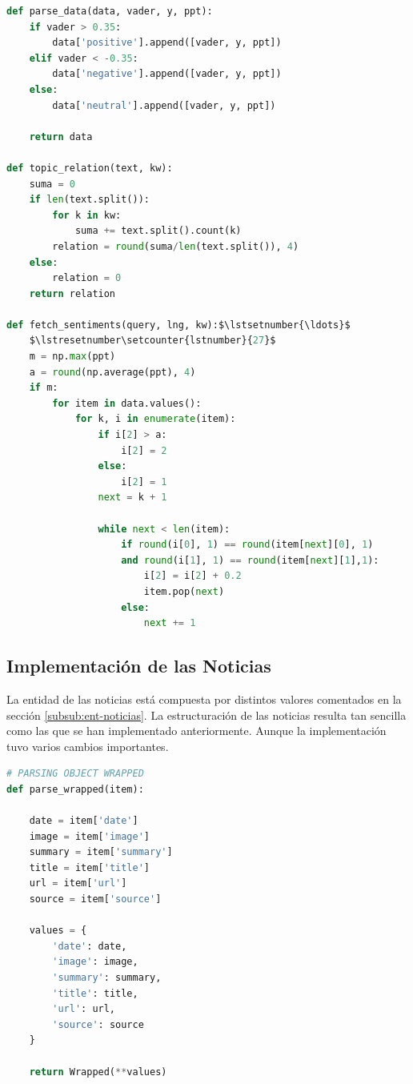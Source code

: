 \vspace{0.3cm}

\begin{lstlisting}[caption=Extracción de las coordenadas de los sentimientos,          label={lst:extraccion-senti},language=Python, mathescape=true]
def parse_data(data, vader, y, ppt):
    if vader > 0.35:
        data['positive'].append([vader, y, ppt])
    elif vader < -0.35:
        data['negative'].append([vader, y, ppt])
    else:
        data['neutral'].append([vader, y, ppt])

    return data

def topic_relation(text, kw):
    suma = 0
    if len(text.split()):
        for k in kw:
            suma += text.split().count(k)
        relation = round(suma/len(text.split()), 4)
    else:
        relation = 0
    return relation

def fetch_sentiments(query, lng, kw):$\lstsetnumber{\ldots}$
    $\lstresetnumber\setcounter{lstnumber}{27}$
    m = np.max(ppt)
    a = round(np.average(ppt), 4)
    if m:
        for item in data.values():
            for k, i in enumerate(item):
                if i[2] > a:
                    i[2] = 2
                else:
                    i[2] = 1
                next = k + 1
    
                while next < len(item):
                    if round(i[0], 1) == round(item[next][0], 1)
                    and round(i[1], 1) == round(item[next][1],1):
                        i[2] = i[2] + 0.2
                        item.pop(next)
                    else:
                        next += 1
\end{lstlisting}

\subsection{Implementación de las Noticias}
La entidad de las noticias está compuesta por distintos valores comentados en la sección \ref{subsub:ent-noticias}. La estructuración de las noticias resulta tan sencilla como las que se han implementado anteriormente. Aunque la implementación tuvo varios cambios importantes.

\vspace{0.3cm}

\begin{lstlisting}[caption=Estructuración de las noticias,language=Python, mathescape=true]
# PARSING OBJECT WRAPPED
def parse_wrapped(item):

    date = item['date']
    image = item['image']
    summary = item['summary']
    title = item['title']
    url = item['url']
    source = item['source']

    values = {
        'date': date,
        'image': image,
        'summary': summary,
        'title': title,
        'url': url,
        'source': source
    }

    return Wrapped(**values)
\end{lstlisting}

